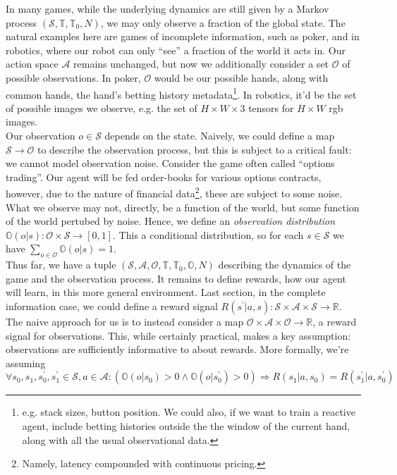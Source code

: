 \documentclass[12pt]{article}
\begin{document}
In many games, while the underlying dynamics are still given by a Markov process $(\mathcal{S}, \mathbb{T}, \mathbb{T}_0, N)$,
we may only observe a fraction of the global state.  The natural examples here are games of incomplete information, such as 
poker, and in robotics, where our robot can only ``see'' a fraction of the world it acts in. Our action space $\mathcal{A}$ 
remains unchanged, but now we additionally consider a set $\mathcal{O}$ of possible observations. In poker, $\mathcal{O}$ would 
be our possible hands, along with common hands, the hand's betting history metadata\footnote{
    e.g. stack sizes, button position. We could also, if we want to train a reactive agent, include betting histories outside 
    the the window of the current hand, along with all the usual observational data. 
}. In robotics, it'd be the set of possible images we observe, e.g. the set of $H \times W \times 3$ tensors for $H \times W$ rgb 
images. \\

Our observation $o \in \mathcal{S}$ depends on the state. Naively, we could define a map $\mathcal{S} \to \mathcal{O}$ to describe 
the observation process, but this is subject to a critical fault: we cannot model observation noise. Consider the game often 
called ``options trading''. Our agent will be fed order-books for various options contracts, however, due to the nature of financial 
data\footnote{
    Namely, latency compounded with continuous pricing.
}, these are subject to some noise. What we observe may not, directly, be a function of the world, but some function of the world 
pertubed by noise. Hence, we define an \textit{observation distribution} $\mathbb{O}(o |s): \mathcal{O} \times \mathcal{S} \to 
[0,1]$. This a conditional distribution, so for each $s \in \mathcal{S}$ we have $\sum_{o \in \mathcal{O}}\mathbb{O}(o | s) = 1$. \\

Thus far, we have a tuple $(\mathcal{S}, \mathcal{A}, \mathcal{O}, \mathbb{T}, \mathbb{T}_0, \mathbb{O}, N)$ describing the 
dynamics of the game and the observation process. It remains to define rewards, how our agent will learn, in this more general
environment. Last section, in the complete information case, we could define a reward signal $R(s^\prime | a, s): \mathcal{S} 
\times \mathcal{A} \times \mathcal{S} \to \mathbb{R}$. The naive approach for us is to instead consider a map $\mathcal{O} \times 
\mathcal{A} \times \mathcal{O} \to \mathbb{R}$, a reward signal for observations. This, while certainly practical, makes a key 
assumption: observations are sufficiently informative to about rewards. More formally, we're assuming 
$$
\forall s_0, s_1, s^\prime_0, s^\prime_1 \in \mathcal{S}, a \in \mathcal{A}: (\mathbb{O}(o | s_0) > 0 \land 
\mathbb{O}(o | s^\prime_0) > 0) \Longrightarrow R(s_1 | a, s_0) = R(s_1^\prime | a, s^\prime_0)
$$
\end{document}
